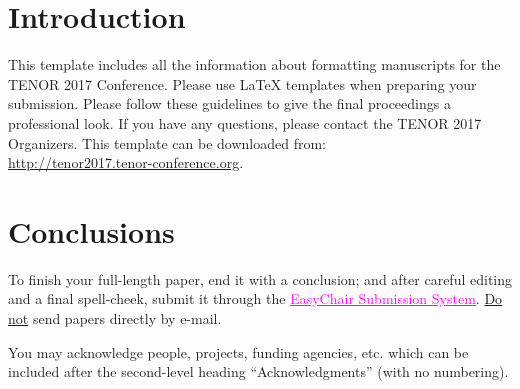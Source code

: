 \documentclass{article}
\title{\papertitle}
\begin{document}
%
\capstartfalse
\maketitle
\capstarttrue
%
\begin{abstract}
Web applications become more and more popular. The ubiquity of web browsers, the advantage of always up-to-date web applications and the inherent support for cross-platform compatibility are among the key reason for their popularity. The music domain is not immune to this trend. Online musical applications are available, including in the music notation domain. Although most of the approaches are based on a classical music engraving approach, or take advantage of the natural sharing facilities of the Internet, the new Web dimension opens the door to innovative musical practices. Indeed, if distributed music scores and collaborative design are among the new features provided by the Internet, the network dimension could also impact the concept of static music score. This paper will address the technological aspects of the Web deployment of music applications and their implication on the music notation and representation, with a focus on the latest developments of INScore, an environment for the design of augmented, interactive music scores.
\end{abstract}
%

\section{Introduction}\label{sec:introduction}
This template includes all the information about formatting manuscripts for 
the TENOR 2017 Conference.
Please use \LaTeX{} templates when 
preparing your submission.
Please follow these guidelines to give the final proceedings a professional look.
If you have any questions, please contact the TENOR 2017 Organizers.
This template can be downloaded from:\\
\url{http://tenor2017.tenor-conference.org}.


\section{Conclusions}
To finish your full-length paper, end it with a conclusion;
and after careful editing and a final spell-cheek,
submit it through the \href{https://easychair.org/conferences/?conf=tenor2017}{\textcolor {magenta} {\underline {EasyChair Submission System}}}. 
\underline{Do not} send papers directly by e-mail.
%
\begin{acknowledgments}
You may acknowledge people, projects, 
funding agencies, etc. 
which can be included after the second-level heading
``Acknowledgments'' (with no numbering).
\end{acknowledgments} 

\balance

\end{document}
